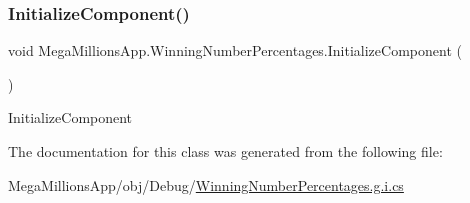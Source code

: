 \subsubsection{\texorpdfstring{Initialize\+Component()}{InitializeComponent()}}
{\footnotesize\ttfamily void Mega\+Millions\+App.\+Winning\+Number\+Percentages.\+Initialize\+Component (\begin{DoxyParamCaption}{ }\end{DoxyParamCaption})}



Initialize\+Component 



The documentation for this class was generated from the following file\+:\begin{DoxyCompactItemize}
\item 
Mega\+Millions\+App/obj/\+Debug/\hyperlink{_winning_number_percentages_8g_8i_8cs}{Winning\+Number\+Percentages.\+g.\+i.\+cs}\end{DoxyCompactItemize}
